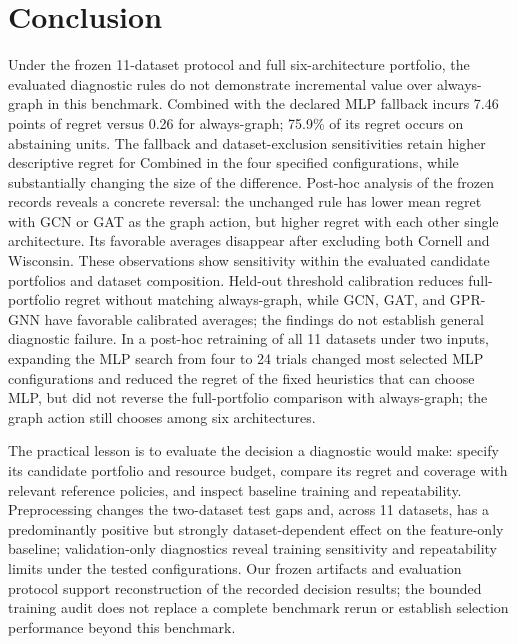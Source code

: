 \section{Conclusion}

Under the frozen 11-dataset protocol and full six-architecture portfolio, the evaluated diagnostic rules do not demonstrate incremental value over always-graph in this benchmark. Combined with the declared MLP fallback incurs 7.46 points of regret versus 0.26 for always-graph; 75.9\% of its regret occurs on abstaining units. The fallback and dataset-exclusion sensitivities retain higher descriptive regret for Combined in the four specified configurations, while substantially changing the size of the difference. Post-hoc analysis of the frozen records reveals a concrete reversal: the unchanged rule has lower mean regret with GCN or GAT as the graph action, but higher regret with each other single architecture. Its favorable averages disappear after excluding both Cornell and Wisconsin. These observations show sensitivity within the evaluated candidate portfolios and dataset composition. Held-out threshold calibration reduces full-portfolio regret without matching always-graph, while GCN, GAT, and GPR-GNN have favorable calibrated averages; the findings do not establish general diagnostic failure. In a post-hoc retraining of all 11 datasets under two inputs, expanding the MLP search from four to 24 trials changed most selected MLP configurations and reduced the regret of the fixed heuristics that can choose MLP, but did not reverse the full-portfolio comparison with always-graph; the graph action still chooses among six architectures.

The practical lesson is to evaluate the decision a diagnostic would make: specify its candidate portfolio and resource budget, compare its regret and coverage with relevant reference policies, and inspect baseline training and repeatability. Preprocessing changes the two-dataset test gaps and, across 11 datasets, has a predominantly positive but strongly dataset-dependent effect on the feature-only baseline; validation-only diagnostics reveal training sensitivity and repeatability limits under the tested configurations. Our frozen artifacts and evaluation protocol support reconstruction of the recorded decision results; the bounded training audit does not replace a complete benchmark rerun or establish selection performance beyond this benchmark.
